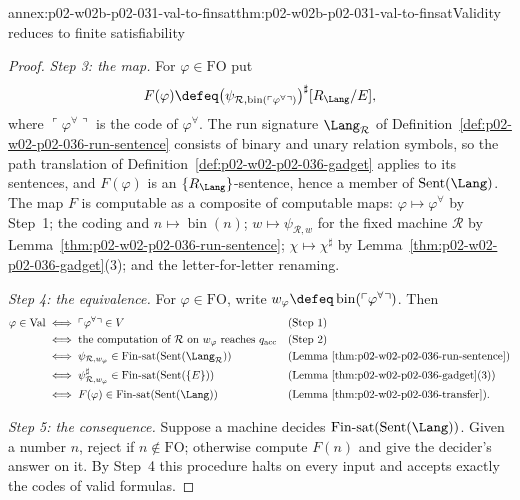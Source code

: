 \begin{annexitem}{annex:p02-w02b-p02-031-val-to-finsat}{thm:p02-w02b-p02-031-val-to-finsat}{Validity reduces to finite satisfiability}
\begin{proof}
\emph{Step 3: the map.}  For \(\varphi\in\mathrm{FO}\) put
\[
 F(\varphi)\defeq
 \bigl(\psi_{\mathcal R,\operatorname{bin}(\ulcorner\varphi^{\forall}\urcorner)}
 \bigr)^{\sharp}[R_{\Lang}/E],
\]
where \(\ulcorner\varphi^{\forall}\urcorner\) is the code of
\(\varphi^{\forall}\).  The run signature \(\Lang_{\mathcal R}\) of
Definition~\ref{def:p02-w02-p02-036-run-sentence} consists of binary and unary
relation symbols, so the path translation of
Definition~\ref{def:p02-w02-p02-036-gadget} applies to its sentences, and
\(F(\varphi)\) is an \(\{R_{\Lang}\}\)-sentence, hence a member of
\(\operatorname{Sent}(\Lang)\).  The map \(F\) is computable as a composite
of computable maps: \(\varphi\mapsto\varphi^{\forall}\) by Step~1; the coding
and \(n\mapsto\operatorname{bin}(n)\); \(w\mapsto\psi_{\mathcal R,w}\) for the
fixed machine \(\mathcal R\) by Lemma~\ref{thm:p02-w02-p02-036-run-sentence};
\(\chi\mapsto\chi^{\sharp}\) by
Lemma~\ref{thm:p02-w02-p02-036-gadget}(3); and the letter-for-letter renaming.

\emph{Step 4: the equivalence.}  For \(\varphi\in\mathrm{FO}\), write
\(w_{\varphi}\defeq\operatorname{bin}(\ulcorner\varphi^{\forall}\urcorner)\).
Then
\[
\begin{aligned}
 \varphi\in\mathrm{Val}
 &\iff \ulcorner\varphi^{\forall}\urcorner\in V
   &&\text{(Step 1)}\\
 &\iff \text{the computation of }\mathcal R\text{ on }w_{\varphi}
   \text{ reaches }q_{\mathrm{acc}}
   &&\text{(Step 2)}\\
 &\iff \psi_{\mathcal R,w_{\varphi}}\in
   \mathrm{Fin\text{-}sat}(\operatorname{Sent}(\Lang_{\mathcal R}))
   &&\text{(Lemma~\ref{thm:p02-w02-p02-036-run-sentence})}\\
 &\iff \psi_{\mathcal R,w_{\varphi}}^{\sharp}\in
   \mathrm{Fin\text{-}sat}(\operatorname{Sent}(\{E\}))
   &&\text{(Lemma~\ref{thm:p02-w02-p02-036-gadget}(3))}\\
 &\iff F(\varphi)\in\mathrm{Fin\text{-}sat}(\operatorname{Sent}(\Lang))
   &&\text{(Lemma~\ref{thm:p02-w02-p02-036-transfer}).}
\end{aligned}
\]

\emph{Step 5: the consequence.}  Suppose a machine decides
\(\mathrm{Fin\text{-}sat}(\operatorname{Sent}(\Lang))\).  Given a number
\(n\), reject if \(n\notin\mathrm{FO}\); otherwise compute \(F(n)\) and give
the decider's answer on it.  By Step~4 this procedure halts on every input and
accepts exactly the codes of valid formulas.
\end{proof}
\end{annexitem}

